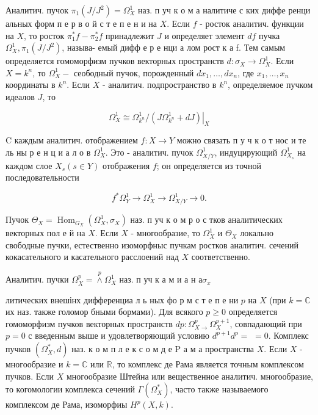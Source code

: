 \documentclass[10pt]{article}
\begin{document}
Аналитич. пучок $\pi_{1}\left(J / J^{2}\right)=\Omega_{X}^{1}$ наз. п уч к о м а налитиче с ких диффе ренци альных форм п е р в о й с т е п е н и на $X$. Если $f$ - росток аналитич. функции на $X$, то росток $\pi_{1}^{*} f-\pi_{2}^{*} f$ принадлежит $J$ и определяет элемент $d f$ пучка $\Omega_{X}^{1}, \pi_{1}\left(J / J^{2}\right)$, называ- емый дифф е р е нци а лом рост к а f. Тем самым определяется гомоморфизм пучков векторных пространств $d: \sigma_{X} \rightarrow \Omega_{X}^{1}$. Если $X=k^{n}$, то $\Omega_{X}^{1}-$ сеободный пучок, порожденный $d x_{1}, \ldots, d x_{n}$, где $x_{1}, \ldots, x_{n}$ координаты в $k^{n}$. Если $X$ - аналитич. подпространство в $k^{n}$, определяемое пучком идеалов $J$, то



\[

\Omega_{X}^{1} \cong \Omega_{k^{n}}^{1} /\left.\left(J \Omega_{k^{n}}^{1}+d J\right)\right|_{X}

\]



$\mathrm{C}$ каждым аналитич. отображением $f: X \rightarrow Y$ можно связать п у ч к о т нос и те ль ны р е н ц и а л о в $\Omega_{X}^{1}$. Это - аналитич. пучок $\Omega_{X / Y}^{1}$, индуцирующий $\Omega_{X_{s}}^{1}$ на каждом слое $X_{s}(s \in Y)$ отображения $f$; он определяется из точной последовательности



\[

f^{*} \Omega_{Y}^{1} \rightarrow \Omega_{X}^{1} \longrightarrow \Omega_{X / Y}^{1} \rightarrow 0 .

\]



Пучок $\Theta_{X}=\operatorname{Hom}_{G_{X}}\left(\Omega_{X}^{1}, \sigma_{X}\right)$ наз. п уч к о м р о с тков аналитических векторных пол е й на $X$. Если $X$ - многообразие, то $\Omega_{X}^{1}$ и $\Theta_{X}$ локально свободные пучки, естественно изоморфныс пучкам ростков аналитич. сечений кокасательного и касательного расслоений над $X$ соответственно.



Аналитич. пучки $\Omega_{X}^{p}=\stackrel{p}{\wedge} \Omega_{X}^{1}$ наз. п уч к а м и а н а$\sigma_{x}$



литических внешінх дифференциа л ь ных фо р м с т е п е ни $p$ на $X$ (при $k=\mathbb{C}$ их наз. также голомор бными бормами). Для всякого $p \geqslant 0$ определяется гомоморфизм пучков векторных пространств $d p: \Omega_{X \rightarrow}^{p} \Omega_{X}^{p+1}$, совпадающий при $p=0$ с введенным выше и удовлетворяющий условию $d^{p+1} d^{p}=$ $=0$. Комплекс пучков $\left(\Omega_{X}^{*}, d\right)$ наз. к о м п л е к с о м д е $\mathrm{P}$ а м а пространства $X$. Если $X$ - многообразие и $k=\mathbb{C}$ или $\mathbb{R}$, то комплекс де Рама является точным комплексом пучков. Если $X$ многообразие Штейна или вещественное аналитич. многообразие, то когомологии комплекса сечений $\Gamma\left(\Omega_{X}^{*}\right)$, часто также называемого комплексом де Рама, изоморфиы $H^{p}(X, k)$.
\end{document}
